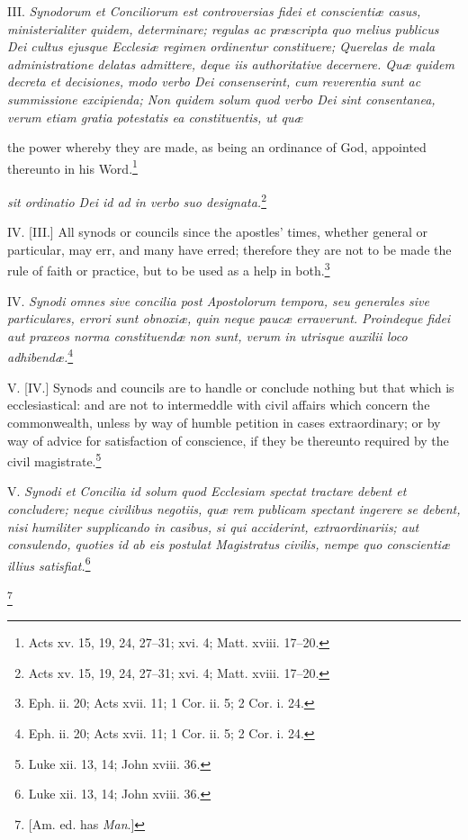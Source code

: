III. \emph{Synodorum et Conciliorum est controversias fidei et conscientiæ casus, ministerialiter quidem, determinare; regulas ac præscripta quo melius publicus Dei cultus ejusque Ecclesiæ regimen ordinentur constituere; Querelas de mala administratione delatas admittere, deque iis authoritative decernere. Quæ quidem decreta et decisiones, modo verbo Dei consenserint, cum reverentia sunt ac summissione excipienda; Non quidem solum quod verbo Dei sint consentanea, verum etiam gratia potestatis ea constituentis, ut quæ }

the power whereby they are made, as being an ordinance of God, appointed thereunto in his Word.\footnote{Acts xv. 15, 19, 24, 27–31; xvi. 4; Matt. xviii. 17–20.}

\emph{sit ordinatio Dei id ad in verbo suo designata.}\footnote{Acts xv. 15, 19, 24, 27–31; xvi. 4; Matt. xviii. 17–20.}

IV. [III.] All synods or councils since the apostles' times, whether general or particular, may err, and many have erred; therefore they are not to be made the rule of faith or practice, but to be used as a help in both.\footnote{Eph. ii. 20; Acts xvii. 11; 1 Cor. ii. 5; 2 Cor. i. 24.}

IV. \emph{Synodi omnes sive concilia post Apostolorum tempora, seu generales sive particulares, errori sunt obnoxiæ, quin neque paucæ erraverunt. Proindeque fidei aut praxeos norma constituendæ non sunt, verum in utrisque auxilii loco adhibendæ.}\footnote{Eph. ii. 20; Acts xvii. 11; 1 Cor. ii. 5; 2 Cor. i. 24.}

V. [IV.] Synods and councils are to handle or conclude nothing but that which is ecclesiastical: and are not to intermeddle with civil affairs which concern the commonwealth, unless by way of humble petition in cases extraordinary; or by way of advice for satisfaction of conscience, if they be thereunto required by the civil magistrate.\footnote{Luke xii. 13, 14; John xviii. 36.}

V. \emph{Synodi et Concilia id solum quod Ecclesiam spectat tractare debent et concludere; neque civilibus negotiis, quæ rem publicam spectant ingerere se debent, nisi humiliter supplicando in casibus, si qui acciderint, extraordinariis; aut consulendo, quoties id ab eis postulat Magistratus civilis, nempe quo conscientiæ illius satisfiat.}\footnote{Luke xii. 13, 14; John xviii. 36.}

\footnote{[Am. ed. has \emph{Man}.]}

